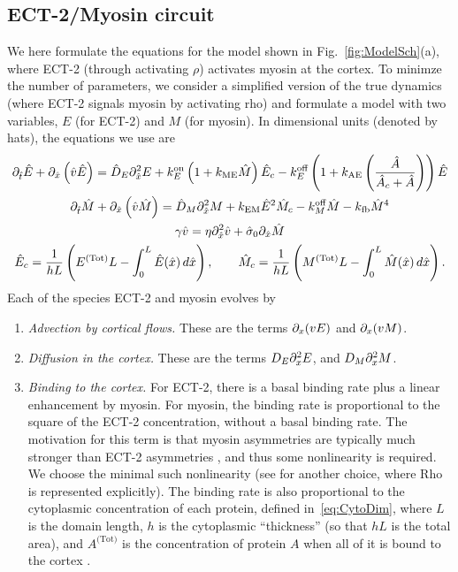 \documentclass[11pt]{article}
\newcommand{\Tot}[1]{#1^\text{(Tot)}}
\begin{document}
\begin{appendix}
\subsection{ECT-2/Myosin circuit \label{sec:MyModel}}
We here formulate the equations for the model shown in Fig.\ \ref{fig:ModelSch}(a), where ECT-2 (through activating $\rho$) activates myosin at the cortex. To minimze the number of parameters, we consider a simplified version of the true dynamics (where ECT-2 signals myosin by activating rho) and formulate a model with two variables, $E$ (for ECT-2) and $M$ (for myosin). In dimensional units (denoted by hats), the equations we use are 
\begin{subequations}
\label{eq:MyDim}
\begin{gather}
\partial_{\hat t} \hat E + \partial_{\hat x} \left( \hat v \hat E\right) = \hat D_E \partial_{\hat x}^2 E +\kon_E \left(1+k_\text{ME} \hat M\right)\hat E_c - \koff_E  \left(1+k_\text{AE}\left( \frac{\hat A}{\hat A_c+\hat A}\right)\right)\hat E \\
\partial_{\hat t} \hat M +\partial_{\hat x} \left( \hat v \hat M\right)  = \hat D_M \partial_{\hat x}^2 M +k_\text{EM} \hat E ^2 \hat M_c - \koff_M \hat M -k_\text{fb} \hat M^4 \\
\label{eq:veleqn}
\gamma \hat v = \eta \partial_{\hat x}^2 \hat v +\hat \sigma_0 \partial_{\hat x} \hat M \\
\label{eq:CytoDim}
\hat E_c = \frac{1}{hL}\left(\Tot{E}L-\int_0^L \hat E(\hat x) \, d\hat x\right), \qquad \hat M_c =\frac{1}{hL}\left(\Tot{M}L-\int_0^L \hat M(\hat x) \, d \hat x\right).
\end{gather} 
\end{subequations}
Each of the species ECT-2 and myosin evolves by
\begin{enumerate}
\item \emph{Advection by cortical flows.}  These are the terms $\partial_x (v E)$ and $\partial_x (v M)$.
\item \emph{Diffusion in the cortex.} These are the terms $D_E \partial_x^2 E$, and $D_M \partial_x^2 M$.
\item \emph{Binding to the cortex.} For ECT-2, there is a basal binding rate plus a linear enhancement by myosin. For myosin, the binding rate is proportional to the square of the ECT-2 concentration, without a basal binding rate. The motivation for this term is that myosin asymmetries are typically much stronger than ECT-2 asymmetries \citep{longhini2022aurora, munro2004cortical, mayer2010anisotropies}, and thus some nonlinearity is required. We choose the minimal such nonlinearity (see \citep[Eq.~(1)]{michaud2022versatile} for another choice, where Rho is represented explicitly). The binding rate is also proportional to the cytoplasmic concentration of each protein, defined in\ \eqref{eq:CytoDim}, where $L$ is the domain length, $h$ is the cytoplasmic ``thickness'' (so that $hL$ is the total area), and $\Tot{A}$ is the concentration of protein $A$ when all of it is bound to the cortex \citep{lang2022oligomerization}.

\end{enumerate}
\end{appendix}
\end{document}
